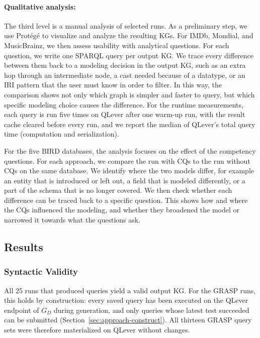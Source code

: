 \paragraph{Qualitative analysis:}
The third level is a manual analysis of selected runs. As a preliminary step, we use Protégé to visualize and analyze the resulting KGs. For IMDb, Mondial, and MusicBrainz, we then assess usability with analytical questions. For each question, we write one SPARQL query per output KG. We trace every difference between them back to a modeling decision in the output KG, such as an extra hop through an intermediate node, a cast needed because of a datatype, or an IRI pattern that the user must know in order to filter. In this way, the comparison shows not only which graph is simpler and faster to query, but which specific modeling choice causes the difference. For the runtime measurements, each query is run five times on QLever after one warm-up run, with the result cache cleared before every run, and we report the median of QLever's total query time (computation and serialization).

For the five BIRD databases, the analysis focuses on the effect of the competency questions. For each approach, we compare the run with CQs to the run without CQs on the same database. We identify where the two models differ, for example an entity that is introduced or left out, a field that is modeled differently, or a part of the schema that is no longer covered. We then check whether each difference can be traced back to a specific question. This shows how and where the CQs influenced the modeling, and whether they broadened the model or narrowed it towards what the questions ask.


\subsection{Results}\label{sec:results}

\subsubsection{Syntactic Validity}\label{sec:results-syntax}

All 25 runs that produced queries yield a valid output KG\@. For the GRASP runs, this holds by construction: every saved query has been executed on the QLever endpoint of \(G_D\) during generation, and only queries whose latest test succeeded can be submitted (Section~\ref{sec:approach-construct}). All thirteen GRASP query sets were therefore materialized on QLever without changes.

